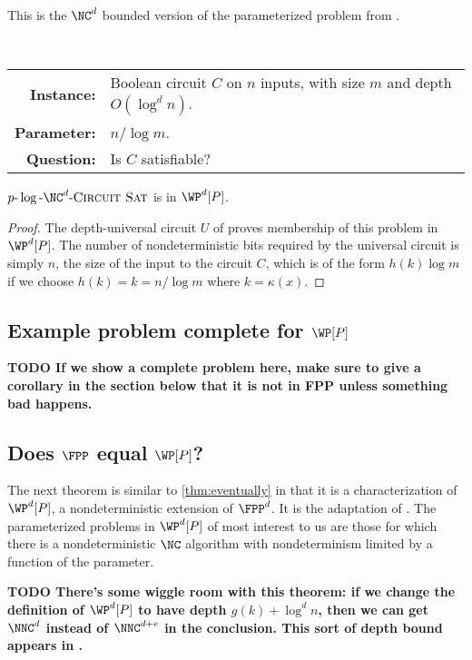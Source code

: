 \documentclass{article}
\newcommand{\todo}[1]{\textbf{TODO #1}}
\newcommand{\dash}{\textnormal{-}}
\newcommand{\pncsat}{p\dash\log\dash\NC^d\dash\textsc{Circuit Sat}}
\begin{document}
This is the $\NC^d$ bounded version of the parameterized problem from \autocite[Lemma~3.26]{fg06}.

\begin{definition}[$\pncsat$]
  \mbox{} \\
  \begin{tabular}{r p{9.2cm}}
    \textbf{Instance:} & Boolean circuit $C$ on $n$ inputs, with size $m$ and depth $O(\log^d n)$. \\
    \textbf{Parameter:} & $n / \log m$. \\
    \textbf{Question:} & Is $C$ satisfiable?
  \end{tabular}
\end{definition}

\begin{lemma}\label{lem:pncsat}
  $\pncsat$ is in $\WP^d[P]$.
\end{lemma}
\begin{proof}
  The depth-universal circuit $U$ of \autocite{ch85} proves membership of this problem in $\WP^d[P]$.
  The number of nondeterministic bits required by the universal circuit is simply $n$, the size of the input to the circuit $C$, which is of the form $h(k) \log m$ if we choose $h(k) = k = n / \log m$ where $k = \kappa(x)$.
\end{proof}

\subsection{Example problem complete for \texorpdfstring{$\WP[P]$}{WP[P]}}

\todo{If we show a complete problem here, make sure to give a corollary in the section below that it is not in FPP unless something bad happens.}

\subsection{Does \texorpdfstring{$\FPP$}{FPP} equal \texorpdfstring{$\WP[P]$}{WP[P]}?}
\label{sec:fppwpp}

The next theorem is similar to \autoref{thm:eventually} in that it is a characterization of $\WP^d[P]$, a nondeterministic extension of $\FPP^d$.
It is the adaptation of \autocite[Proposition~3.7]{fg06}.
The parameterized problems in $\WP^d[P]$ of most interest to us are those for which there is a nondeterministic $\NC$ algorithm with nondeterminism limited by a function of the parameter.

\todo{
  There's some wiggle room with this theorem: if we change the definition of $\WP^d[P]$ to have depth $g(k) + \log^d n$, then we can get $\NNC^d$ instead of $\NNC^{d + e}$ in the conclusion.
  This sort of depth bound appears in \autocite{bst15}.
}
\end{document}
